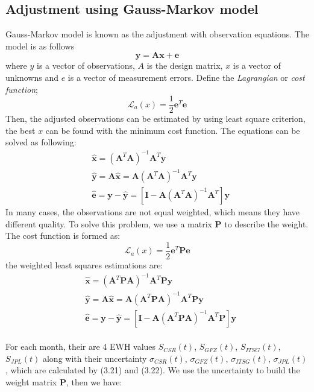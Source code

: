\subsection{Adjustment using Gauss-Markov model}\label{sec:Gaussmarkov}
Gauss-Markov model is known as the adjustment with observation equations. The model is as follows
\begin{equation}
\bm{y} = \bm{A}\bm{x} + \bm{e}
\end{equation}
where $y$ is a vector of observations, $A$ is the design matrix, $x$ is a vector of unknowns and $e$ is a vector of measurement errors. Define the \textit{Lagrangian} or \textit{cost function};
\begin{equation}
\mathcal{L}_{a}(x) = \frac{1}{2} \bm{e}^T \bm{e}
\end{equation} 
Then, the adjusted observations can be estimated by using least square criterion, the best $x$ can be found with the minimum cost function. The equations can be solved as following:
\begin{align}
&\hat{\bm{x}} = (\bm{A}^T\bm{A})^{-1}\bm{A}^T\bm{y}\\
&\hat{\bm{y}} = \bm{A}\hat{\bm{x}} = \bm{A}(\bm{A}^T\bm{A})^{-1}\bm{A}^T\bm{y}\\
&\hat{\bm{e}} = \bm{y} - \hat{\bm{y}} = [\bm{I} - \bm{A}(\bm{A}^T\bm{A})^{-1}\bm{A}^T]\bm{y}
\end{align}
In many cases, the observations are not equal weighted, which means they have different quality. To solve this problem,  we use a matrix $\bm{P}$ to describe the weight. The cost function is formed as:
\begin{equation}
\mathcal{L}_{a}(x) = \frac{1}{2} \bm{e}^T \bm{P}\bm{e}
\end{equation}
the weighted least squares estimations are:
\begin{align}
\label{equa:guass0}
&\hat{\bm{x}} = (\bm{A}^T \bm{P}\bm{A})^{-1}\bm{A}^T\bm{P}\bm{y}\\ 
&\hat{\bm{y}} = \bm{A}\hat{\bm{x}} = \bm{A}(\bm{A}^T\bm{P}\bm{A})^{-1}\bm{A}^T\bm{P}\bm{y}\\
&\hat{\bm{e}} = \bm{y} - \hat{\bm{y}} = [\bm{I} - \bm{A}(\bm{A}^T\bm{P}\bm{A})^{-1}\bm{A}^T\bm{P}]\bm{y}
\end{align}\\
For each month, their are 4 EWH values $S_{CSR}(t)$, $S_{GFZ}(t)$, $S_{ITSG}(t)$, $S_{JPL}(t)$ along with their uncertainty $\sigma_{CSR}(t)$, $\sigma_{GFZ}(t)$, $\sigma_{ITSG}(t)$, $\sigma_{JPL}(t)$, which are calculated by (3.21) and (3.22). We use the uncertainty to build the weight matrix $\bm{P}$, then we have:
